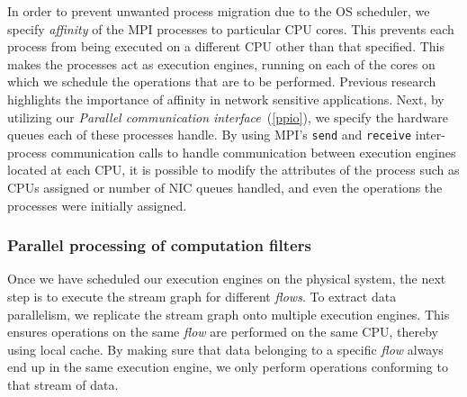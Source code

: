 \documentclass[10pt, conference, compsocconf, reqno]{IEEEtran}
\newcommand{\comment}[1]{}
\begin{document}
In order to prevent unwanted process migration due to the OS scheduler, we specify \textit{affinity} of the MPI processes to particular CPU cores. This prevents each process from being executed on a different CPU other than that specified. This makes the processes act as execution engines, running on each of the cores on which we schedule the operations that are to be performed. Previous research \cite{Salehi:1996:EAS:234766.234769}\cite{1409136} highlights the importance of affinity in network sensitive applications. Next, by utilizing our \textit{Parallel communication interface}~(\ref{ppio}), we specify the hardware queues each of these processes handle. \comment{Initially we divide the queues evenly among the different processes we create, but later during execution we could modify the allocation based on the application operations scheduled on them. Our modifications to \texttt{netmap}'s hardware queue assignment API can help us here in redistributing the queues to different processes.} By using MPI's \texttt{send} and \texttt{receive} inter-process communication calls to handle communication between execution engines located at each CPU, it is possible to modify the attributes of the process such as CPUs assigned or number of NIC queues handled, and even the operations the processes were initially assigned.

\subsubsection{Parallel processing of computation filters}
\label{ppt}

Once we have scheduled our execution engines on the physical system, the next step is to execute the stream graph for different \textit{flows}. To extract data parallelism, we replicate the stream graph onto multiple execution engines. This ensures operations on the same \textit{flow} are performed on the same CPU, thereby using local cache. By making sure that data belonging to a specific \textit{flow} always end up in the same execution engine, we only perform operations conforming to that stream of data. \comment{We use the ability of modern NICs to classify packets onto different queues, based on their attributes.}


\comment{
\lstset{language=C,caption={Packet Payload Modification Function},label=payload_sub}
\begin{lstlisting}
bool payload_copy( const void *payload_data, uint32_t length )
{
    uint32_t headroom = _data - _head;
    uint32_t tailroom = _end - _tail;
    uint32_t orig_length = _tail - _data;
    uint32_t n = length + headroom + tailroom;
    if( n < min_buffer_length )
    {
        tailroom = min_buffer_length - length - headroom;
        n = min_buffer_length;
    }
    _data = _head + headroom;
    _tail = _data + length;
    if( payload_data )
        memcpy( _data, payload_data, length );
    return true;
}
\end{lstlisting}
}
\end{document}

